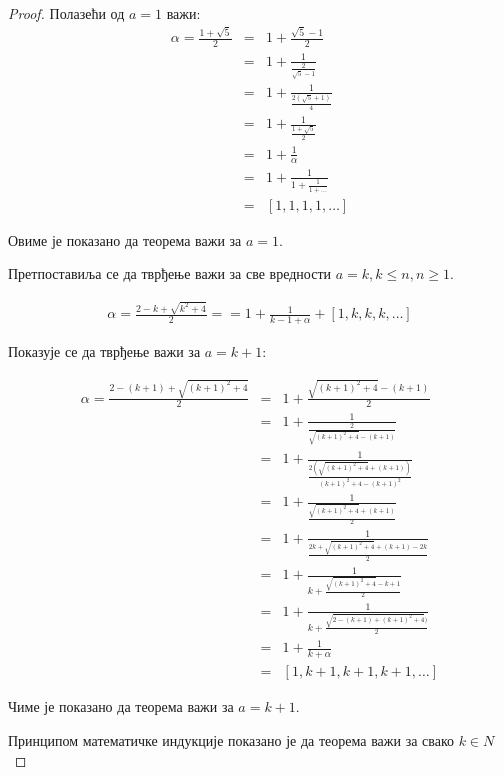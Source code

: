 \documentclass[a4paper]{article}
\begin{document}
\begin{proof}
	Полазећи од $ a = 1 $ важи:	
	\begin{eqnarray*}
		\alpha = \frac{1+\sqrt 5}{2} &=& 1 + \frac{\sqrt 5 - 1}{2}\\
									 &=& 1 + \frac{1}{\frac{2}{\sqrt 5 - 1}}\\
									 &=& 1 + \frac{1}{\frac{2(\sqrt 5 + 1)}{4}}\\
									 &=& 1 + \frac{1}{\frac{1 + \sqrt 5}{2}}\\
									 &=& 1 + \frac{1}{\alpha}\\
									 &=& 1 + \frac{1}{1 + \frac{1}{1 + \ldots}}\\
									 &=& [1, 1, 1, 1, \ldots]
	\end{eqnarray*}
	
	Овиме је показано да теорема важи за $ a = 1 $.
	
	Претпоставиља се да тврђење важи за све вредности $ a = k, k \leq n, n \geq 1 $. 
	
	\begin{eqnarray*}
		\alpha = \frac{2 - k + \sqrt{k^2+4}}{2} = = 1 + \frac{1}{k-1+\alpha} + [1, k, k, k, \ldots]
	\end{eqnarray*}
	
	Показује се да тврђење важи за $ a = k + 1 $:
	
	\begin{eqnarray*}
		\alpha = \frac{2 - (k + 1) + \sqrt{(k + 1)^2 + 4}}{2} &=& 1 + \frac{\sqrt{(k + 1)^2 + 4} - (k + 1)}{2}\\
															  &=& 1 + \frac{1}{\frac{2}{\sqrt{(k + 1)^2 + 4} - (k + 1)}}\\
															  &=& 1 + \frac{1}{\frac{2(\sqrt{(k + 1)^2 + 4} + (k + 1))}{(k + 1)^2 + 4 - (k + 1)^2}}\\
															  &=& 1 + \frac{1}{\frac{\sqrt{(k + 1)^2 + 4} + (k + 1)}{2}}\\
															  &=& 1 + \frac{1}{\frac{2k + \sqrt{(k + 1)^2 + 4} + (k + 1) - 2k}{2}}\\
															  &=& 1 + \frac{1}{k + \frac{\sqrt{(k + 1)^2 + 4} - k + 1}{2}}\\
															  &=& 1 + \frac{1}{k + \frac{\sqrt{2 - (k + 1) + (k + 1)^2 + 4})}{2}}\\
															  &=& 1 + \frac{1}{k + \alpha}\\
															  &=& [1, k+1, k+1, k+1, \ldots]
	\end{eqnarray*}

	Чиме је показано да теорема важи за $ a = k + 1 $. 
	
	Принципом математичке индукције показано је да теорема важи за свако $ k \in N $
\end{proof}
\end{document}
